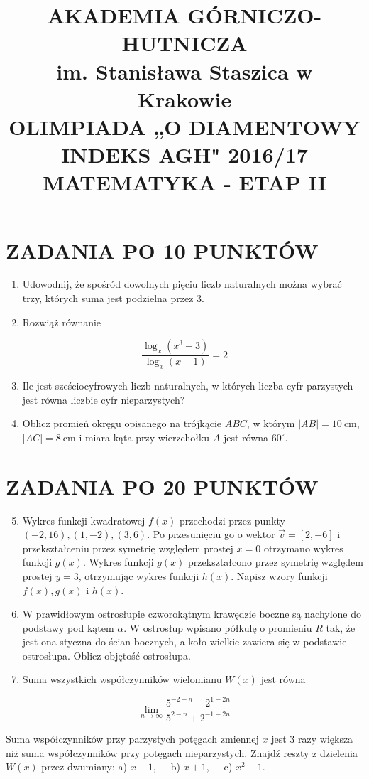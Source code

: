 \documentclass[10pt]{article}
\title{AKADEMIA GÓRNICZO-HUTNICZA \\
 im. Stanisława Staszica w Krakowie \\
 OLIMPIADA „O DIAMENTOWY INDEKS AGH" 2016/17 \\
 MATEMATYKA - ETAP II }
\author{}
\date{}
\begin{document}
\maketitle
\section*{ZADANIA PO 10 PUNKTÓW}
\begin{enumerate}
  \item Udowodnij, że spośród dowolnych pięciu liczb naturalnych można wybrać trzy, których suma jest podzielna przez 3.
  \item Rozwiąż równanie
\end{enumerate}

$$
\frac{\log _{x}\left(x^{3}+3\right)}{\log _{x}(x+1)}=2
$$

\begin{enumerate}
  \setcounter{enumi}{2}
  \item Ile jest sześciocyfrowych liczb naturalnych, w których liczba cyfr parzystych jest równa liczbie cyfr nieparzystych?
  \item Oblicz promień okręgu opisanego na trójkącie $A B C$, w którym $|A B|=10 \mathrm{~cm}$, $|A C|=8 \mathrm{~cm}$ i miara kąta przy wierzchołku $A$ jest równa $60^{\circ}$.
\end{enumerate}

\section*{ZADANIA PO 20 PUNKTÓW}
\begin{enumerate}
  \setcounter{enumi}{4}
  \item Wykres funkcji kwadratowej $f(x)$ przechodzi przez punkty $(-2,16),(1,-2),(3,6)$. Po przesunięciu go o wektor $\vec{v}=[2,-6]$ i przekształceniu przez symetrię względem prostej $x=0$ otrzymano wykres funkcji $g(x)$. Wykres funkcji $g(x)$ przekształcono przez symetrię względem prostej $y=3$, otrzymując wykres funkcji $h(x)$. Napisz wzory funkcji $f(x), g(x)$ i $h(x)$.
  \item W prawidłowym ostrosłupie czworokątnym krawędzie boczne są nachylone do podstawy pod kątem $\alpha$. W ostrosłup wpisano półkulę o promieniu $R$ tak, że jest ona styczna do ścian bocznych, a koło wielkie zawiera się w podstawie ostrosłupa. Oblicz objętość ostrosłupa.
  \item Suma wszystkich współczynników wielomianu $W(x)$ jest równa
\end{enumerate}

$$
\lim _{n \rightarrow \infty} \frac{5^{-2-n}+2^{1-2 n}}{5^{2-n}+2^{-1-2 n}}
$$

Suma współczynników przy parzystych potęgach zmiennej $x$ jest 3 razy większa niż suma współczynników przy potęgach nieparzystych. Znajdź reszty z dzielenia $W(x)$ przez dwumiany: a) $x-1, \quad$ b) $x+1, \quad$ c) $x^{2}-1$.
\end{document}
